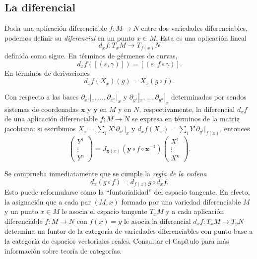 \documentclass[11pt,a4paper]{amsbook}
\theoremstyle{remark} \newtheorem{rmk}[subsection]{Observación}
\theoremstyle{definition} \newtheorem{defn}[subsection]{Definición}
\theoremstyle{definition} \newtheorem{ex}[subsection]{Ejemplo}
\theoremstyle{definition} \newtheorem{ej}[subsection]{Ejercicio}
\begin{document}
\subsection{La diferencial} Dada una aplicación diferenciable $f:M\rightarrow N$ entre dos variedades diferenciables, podemos definir su \emph{diferencial} en un punto $x\in M$. Esta es una aplicación lineal
\begin{equation*}
d_x f: T_xM \rightarrow T_{f(x)}N
\end{equation*}
definida como sigue. En términos de gérmenes de curvas,
\begin{equation*}
d_x f ([(\varepsilon,\gamma)]) = [(\varepsilon, f\circ \gamma)].
\end{equation*}
En términos de derivaciones
\begin{equation*}
d_xf(X_x) (g) = X_x(g \circ f).
\end{equation*}

Con respecto a las bases $\partial_{x^1}|_x,\dots,\partial_{x^n}|_x$ y $\partial_{y^1}|_x,\dots,\partial_{y^n}|_x$ determinadas por sendos sistemas de coordenadas $\bm{x}$ y $\bm{y}$ en $M$ y en $N$, respectivamente, la diferencial $d_xf$ de una aplicación diferenciable $f:M\rightarrow N$ se expresa en términos de la matriz jacobiana: si escribimos $X_x = \sum_i X^i \partial_{x^i}|_x$ y $d_xf(X_x)= \sum_i Y^i \partial_{y^i}|_{f(x)}$, entonces
\begin{equation*}
\begin{pmatrix}
  Y^1 \\
  \vdots \\
  Y^n
\end{pmatrix} =  J_{\bm{x}(x)}(\bm{y} \circ f \circ \bm{x}^{-1})
\begin{pmatrix}
  X^1 \\
  \vdots \\
  X^n
\end{pmatrix}.
\end{equation*}

Se comprueba inmediatamente que se cumple la \emph{regla de la cadena}
\begin{equation*}
d_x(g \circ f) = d_{f(x)} g \circ d_x f.
\end{equation*}
Esto puede reformularse como la ``funtorialidad'' del espacio tangente. En efecto, la asignación que a cada par $(M,x)$ formado por una variedad diferenciable $M$ y un punto $x\in M$ le asocia el espacio tangente $T_xM$ y a cada aplicación diferenciable $f:M\rightarrow N$ con $f(x)=y$ le asocia la diferencial $d_xf: T_xM \rightarrow T_yN$ determina un funtor de la categoría de variedades diferenciables con punto base a la categoría de espacios vectoriales reales. Consultar el Capítulo  para más información sobre teoría de categorías.
\end{document}
